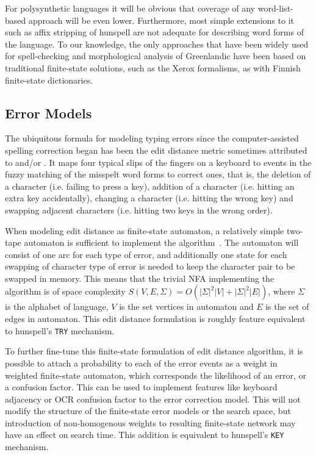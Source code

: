 \documentclass[11pt]{article}
\begin{document}
For polysynthetic languages it will be obvious that coverage of any
word-list-based approach will be even lower. Furthermore, most simple extensions
to it such as affix stripping of hunspell are not adequate for describing
word forms of the language. To our knowledge, the only approaches that have
been widely used for spell-checking and morphological analysis of Greenlandic
have been based on traditional finite-state solutions, such as the Xerox formalisms,
as with Finnish finite-state dictionaries.

\subsection{Error Models}
\label{subsec:error-models}

The ubiquitous formula for modeling typing errors since the computer-assisted
spelling correction began has been the edit distance metric sometimes
attributed to  and/or
. It maps four
typical slips of the fingers on a keyboard to events in the fuzzy matching of the
misspelt word forms to correct ones, that is, the deletion of a character
(i.e. failing to
press a key), addition of a character (i.e. hitting an extra key
accidentally), changing a character (i.e. hitting the wrong key) and swapping
adjacent characters (i.e. hitting two keys in the wrong order).

When modeling edit
distance as finite-state automaton, a relatively simple two-tape automaton is
sufficient to implement the algorithm~\cite{hassan/2008}. The automaton
will consist of one arc for each type of error, and additionally one state for each
swapping of character type of error is needed to keep the character pair to be
swapped in memory. This means that the trivial NFA implementing the algorithm
is of space complexity $S(V, E, \Sigma) = O(|\Sigma|^2 |V| + |\Sigma|^2 |E|)$,
where $\Sigma$ is the alphabet of language, $V$ is the set vertices in
automaton and $E$ is the set of edges in automaton.  This edit distance
formulation is roughly feature equivalent to hunspell's \texttt{TRY} mechanism.

To further fine-tune this finite-state formulation of edit distance algorithm,
it is possible to attach a probability to each of the error events as a weight
in weighted finite-state automaton, which corresponds the likelihood of an error,
or a confusion factor. This can be used to implement features like keyboard
adjacency or OCR confusion factor to the error correction model. This will not
modify the structure of the finite-state error models or the search space, but
introduction of non-homogenous weights to resulting finite-state network may
have an effect on search time. This addition is equivalent to hunspell's
\texttt{KEY} mechanism.
\end{document}

